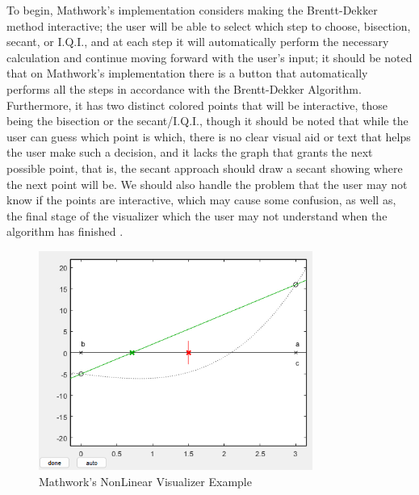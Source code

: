 To begin, Mathwork's implementation considers making the Brentt-Dekker method interactive; the user will be able to select which step to choose, bisection, secant, or I.Q.I., and at each step it will automatically perform the necessary calculation and continue moving forward with the user's input; it should be noted that on Mathwork's implementation there is a button that automatically performs all the steps in accordance with the Brentt-Dekker Algorithm. Furthermore, it has two distinct colored points that will be interactive, those being the bisection or the secant/I.Q.I., though it should be noted that while the user can guess which point is which, there is no clear visual aid or text that helps the user make such a decision, and it lacks the graph that grants the next possible point, that is, the secant approach should draw a secant showing where the next point will be. We should also handle the problem that the user may not know if the points are interactive, which may cause some confusion, as well as, the final stage of the visualizer  which the user may not understand when the algorithm has finished .

\begin{figure}[H]
    \centering
    \includegraphics[width=0.8\textwidth]{Include/Images/Thesis/Development/Visualizers/NON LINEAR VISUALIZER/Mathworks.NonLinear.Ex1.png}
    \caption{Mathwork's NonLinear Visualizer Example}
    \label{fig:Mathwork's NonLinear Visualizer Example}
\end{figure}


